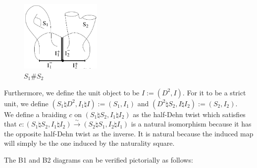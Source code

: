\documentclass[reqno]{amsart}
\theoremstyle{definition}
\theoremstyle{remark}
\begin{document}
   \begin{figure}[htpb]
       \centering
       \includegraphics[width=0.35\textwidth]{connected-sum.png}
       \caption{$S_1 \# S_2$ }
       \label{fig:connected-sum-png}
   \end{figure}

   Furthermore, we define the unit object to be
   $I := \left( D^2, I \right) $. For it to be a strict unit, 
   we define $\left( S_1 \natural D^2, I_1 \natural I \right) 
   := \left( S_1, I_1 \right) $ and
   $\left( D^2 \natural S_2, I \natural I_2 \right) :=
   \left( S_2, I_2 \right) $.\\
   

   We define a braiding $c$ on
   $\left( S_1 \natural S_2, I_1 \natural I_2 \right) $ 
   as the half-Dehn twist which satisfies that
   $c \colon \left( S_1 \natural S_2, I_1 \natural I_2 \right) 
   \stackrel{\sim}{\to } \left( S_2 \natural S_1, I_2 \natural I_1 \right)  $
   is a natural isomorphism because
   it has the opposite half-Dehn twist as the inverse. It is
   natural because the induced map will simply be the one induced by
   the naturality square.

   The B1 and B2 diagrams can be verified pictorially as follows:
\end{document}
